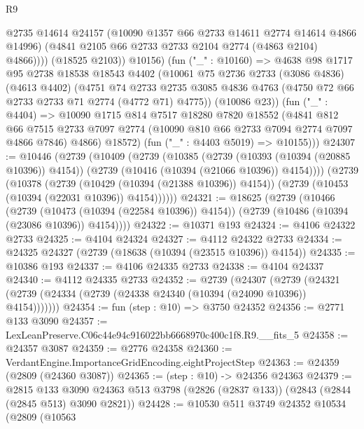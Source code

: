 \begin{lexlean}{R9}
\begin{coremodule}
                @2735
                @14614
                @24157
                (@10090 @1357 @66 @2733 @14611 @2774 @14614 @4866 @14996)
                (@4841 @2105 @66 @2733 @2733 @2104 @2774 (@4863 @2104) @4866))))
          (@18525 @2103))
        @10156)
      (fun ("_" : @10160) =>
      @4638
        @98
        @1717
        @95
        @2738
        @18538
        @18543
        @4402
        (@10061
          @75
          @2736
          @2733
          (@3086 @4836)
          (@4613 @4402)
          (@4751
            @74
            @2733
            @2735
            @3085
            @4836
            @4763
            (@4750 @72 @66 @2733 @2733 @71 @2774 (@4772 @71) @4775))
          (@10086 @23))
        (fun ("_" : @4404) =>
        @10090
          @1715
          @814
          @7517
          @18280
          @7820
          @18552
          (@4841
            @812
            @66
            @7515
            @2733
            @7097
            @2774
            (@10090 @810 @66 @2733 @7094 @2774 @7097 @4866 @7846)
            @4866)
          @18572)
        (fun ("_" : @4403 @5019) => @10155)))
@24307 := @10446
    (@2739
      (@10409
        (@2739
          (@10385
            (@2739 (@10393 (@10394 (@20885 @10396)) @4154))
            (@2739 (@10416 (@10394 (@21066 @10396)) @4154))))
        (@2739
          (@10378
            (@2739 (@10429 (@10394 (@21388 @10396)) @4154))
            (@2739 (@10453 (@10394 (@22031 @10396)) @4154))))))
@24321 := @18625
    (@2739
      (@10466
        (@2739 (@10473 (@10394 (@22584 @10396)) @4154))
        (@2739 (@10486 (@10394 (@23086 @10396)) @4154))))
@24322 := @10371 @193
@24324 := @4106 @24322 @2733
@24325 := @4104 @24324
@24327 := @4112 @24322 @2733
@24334 := @24325 @24327 (@2739 (@18638 (@10394 (@23515 @10396)) @4154))
@24335 := @10386 @193
@24337 := @4106 @24335 @2733
@24338 := @4104 @24337
@24340 := @4112 @24335 @2733
@24352 := @2739
    (@24307
      (@2739 (@24321 (@2739 (@24334 (@2739 (@24338 @24340 (@10394 (@24090 @10396)) @4154)))))))
@24354 := fun (step : @10) => @3750 @24352
@24356 := @2771 @133 @3090
@24357 := LexLeanPreserve.C06c44e94c916022bb6668970c400c1f8.R9.__fits_5
@24358 := @24357 @3087
@24359 := @2776 @24358
@24360 := VerdantEngine.ImportanceGridEncoding.eightProjectStep
@24363 := @24359 (@2809 (@24360 @3087))
@24365 := (step : @10) -> @24356 @24363
@24379 := @2815
    @133
    @3090
    @24363
    @513
    @3798
    (@2826 (@2837 @133))
    (@2843 (@2844 (@2845 @513) @3090 @2821))
@24428 := @10530
    @511
    @3749
    @24352
    @10534
    (@2809
      (@10563

\end{coremodule}
\end{lexlean}
